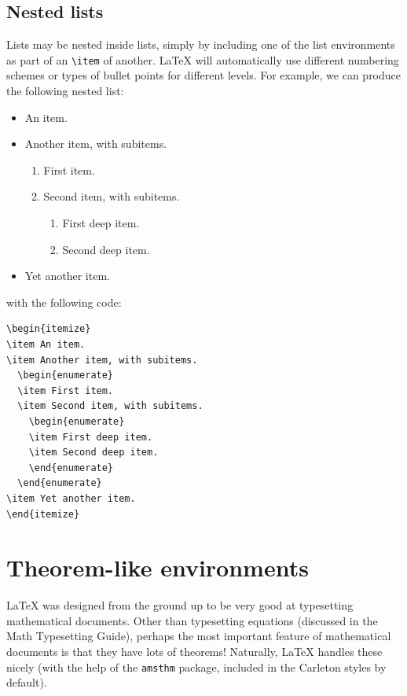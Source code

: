 \documentclass{article}
\newcommand*{\code}[1]{\texttt{#1}}
\begin{document}
\subsection{Nested lists}
\label{s:nestedlists}
Lists may be nested inside lists, simply by including one of the list environments as part of an \code{\textbackslash{}item} of another.
\LaTeX{} will automatically use different numbering schemes or types of bullet points for different levels.
For example, we can produce the following nested list:
\begin{itemize}
\item An item.
\item Another item, with subitems.
  \begin{enumerate}
  \item First item.
  \item Second item, with subitems.
    \begin{enumerate}
    \item First deep item.
    \item Second deep item.
    \end{enumerate}
  \end{enumerate}
\item Yet another item.
\end{itemize}
with the following code:
\begin{verbatim}
\begin{itemize}
\item An item.
\item Another item, with subitems.
  \begin{enumerate}
  \item First item.
  \item Second item, with subitems.
    \begin{enumerate}
    \item First deep item.
    \item Second deep item.
    \end{enumerate}
  \end{enumerate}
\item Yet another item.
\end{itemize}
\end{verbatim}

\section{Theorem-like environments}
\label{s:thms}
\LaTeX{} was designed from the ground up to be very good at typesetting mathematical documents.
Other than typesetting equations (discussed in the Math Typesetting Guide), perhaps the most important feature of mathematical documents is that they have lots of theorems!
Naturally, \LaTeX{} handles these nicely (with the help of the \code{amsthm} package, included in the Carleton styles by default).
\end{document}
